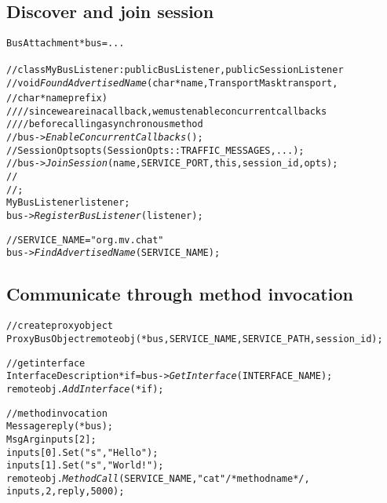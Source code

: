\documentclass{note}
\begin{document}
\subsection*{Discover and join session}
\begin{alltt}
  BusAttachment *bus = ...

  // class MyBusListener : public BusListener, public SessionListener {
  //  void {\em{}FoundAdvertisedName}(char *name, TransportMask transport,
  //                          char *nameprefix) {
  //     // since we are in a callback, we must enable concurrent callbacks
  //     // before calling a synchronous method
  //     bus->{\em{}EnableConcurrentCallbacks}();
  //     SessionOpts opts(SessionOpts::TRAFFIC_MESSAGES, ... );
  //     bus->{\em{}JoinSession}(name, SERVICE_PORT, this, session_id, opts);
  //  }
  //};
  MyBusListener listener;
  bus->{\em{}RegisterBusListener}(listener);

  // SERVICE_NAME = "org.mv.chat"
  bus->{\em{}FindAdvertisedName}(SERVICE_NAME);
\end{alltt}


\subsection*{Communicate through method invocation}
\begin{alltt}
  // create proxy object
  ProxyBusObject remoteobj(*bus, SERVICE_NAME, SERVICE_PATH, session_id);

  // get interface
  InterfaceDescription *if = bus->{\em{}GetInterface}(INTERFACE_NAME);
  remoteobj.{\em{}AddInterface}(*if);

  // method invocation
  Message reply(*bus);
  MsgArg inputs[2];
  inputs[0].Set("s", "Hello ");
  inputs[1].Set("s", "World!");
  remoteobj.{\em{}MethodCall}(SERVICE_NAME, "cat" /* method name */,
                              inputs, 2, reply, 5000);
\end{alltt}
\end{document}
